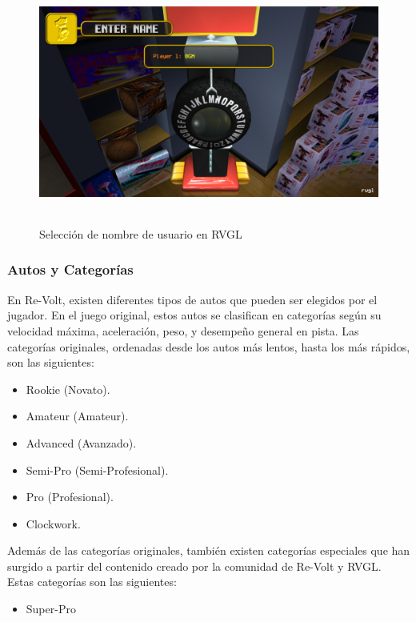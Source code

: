 \begin{figure}[H]
  \begin{center}
    \includegraphics[width=15cm, height=8cm]{img/username.png}
  \end{center}
  \caption[Selección de nombre de usuario en RVGL]{Selección de nombre de usuario en RVGL}
  \label{fig:username}
\end{figure}

\subsubsection{Autos y Categorías}
En Re-Volt, existen diferentes tipos de autos que pueden ser elegidos por el jugador. En el juego original, estos autos se clasifican en categorías según su velocidad máxima, aceleración, peso, y desempeño general en pista. Las categorías originales, ordenadas desde los autos más lentos, hasta los más rápidos, son las siguientes:

\begin{itemize}
	\item Rookie (Novato).
	\item Amateur (Amateur).
	\item Advanced (Avanzado).
	\item Semi-Pro (Semi-Profesional).
	\item Pro (Profesional).
  \item Clockwork.
\end{itemize}

Además de las categorías originales, también existen categorías especiales que han surgido a partir del contenido creado por la comunidad de Re-Volt y RVGL. Estas categorías son las siguientes:

\begin{itemize}
	\item Super-Pro
\end{itemize}

